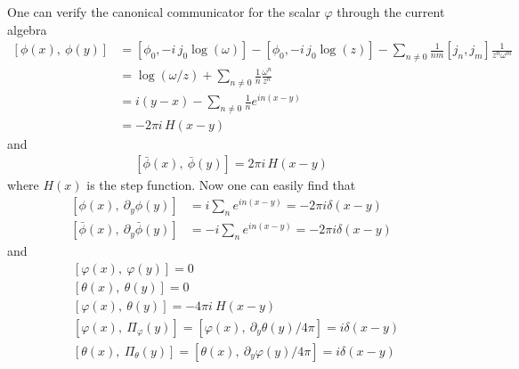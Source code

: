 One can verify the canonical communicator for the scalar $\varphi$ through the current algebra
\begin{equation}
	\begin{aligned}
		\left[\phi(x),\ \phi(y)\right] &= \left[  \phi_0, -i\,j_0\log (\omega)\right] - \left[  \phi_0, -i\,j_0\log (z)\right] - \sum_{n\neq0} \frac{1}{nm} \left[ j_n, j_m \right] \frac{1}{z^n \omega^m} \\
		&= \log(\omega/z) + \sum_{n\neq0} \frac{1}{n}\frac{\omega^n}{z^n} \\
		&= i \left( y-x \right) - \sum_{n\neq0} \frac{1}{n}e^{i n \left(x-y\right)} \\
		&=-2\pi i \,H(x-y)
	\end{aligned}
\end{equation}
and
\begin{equation}
	\begin{aligned}
		\left[\bar{\phi}(x),\ \bar{\phi}(y)\right]  = 2\pi i \,H(x-y)
	\end{aligned}
\end{equation}
where $H(x)$ is the step function. Now one can easily find that
\begin{equation}
	\begin{aligned}
		\left[\phi(x),\ \partial_y\phi(y)\right] &= i\sum_n e^{in(x-y)} = -2\pi i \delta(x-y) \\
		\left[\bar{\phi}(x),\ \partial_y\bar{\phi}(y)\right] &= -i\sum_n e^{in(x-y)} = -2\pi i \delta(x-y)
	\end{aligned}
\end{equation}
and 
\begin{equation}
	\begin{aligned}
		&\left[\varphi(x), \ \varphi(y)\right] = 0 \\
		&\left[\theta(x), \ \theta(y)\right] = 0 \\
		&\left[\varphi(x), \ \theta(y)\right] = -4\pi i \ H(x-y)\\
		&\left[\varphi(x), \ \Pi_\varphi(y)\right] = \left[\varphi(x), \ \partial_y \theta(y)/4\pi\right] = i\delta(x-y)\\
		&\left[\theta(x), \ \Pi_\theta(y)\right] = \left[\theta(x), \ \partial_y \varphi(y)/4\pi\right] = i\delta(x-y)
	\end{aligned}
\end{equation}

